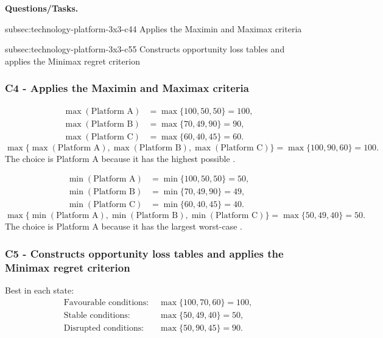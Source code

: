 	\textbf{Questions/Tasks.}
	\begin{enumerate}
		\CriterionTask
		{subsec:technology-platform-3x3-c4}{4}
		{Applies the Maximin and Maximax criteria}

		\CriterionTask
		{subsec:technology-platform-3x3-c5}{5}
		{Constructs opportunity loss tables and applies the Minimax regret criterion}
	\end{enumerate}
	
	\subsubsection*{C4 - Applies the Maximin and Maximax criteria}
	\label{subsec:technology-platform-3x3-c4}
	
	\[
	\begin{aligned}
		\max(\text{Platform A}) &= \max\{100,50,50\}=100,\\
		\max(\text{Platform B}) &= \max\{70,49,90\}=90,\\
		\max(\text{Platform C}) &= \max\{60,40,45\}=60.
	\end{aligned}
	\]
	\[
	\max\{\max(\text{Platform A}),\max(\text{Platform B}),
	\max(\text{Platform C})\}
	=\max\{100,90,60\}
	=100.
	\]
	The  choice is Platform A because it has the highest possible .
	
	\[
	\begin{aligned}
		\min(\text{Platform A}) &= \min\{100,50,50\}=50,\\
		\min(\text{Platform B}) &= \min\{70,49,90\}=49,\\
		\min(\text{Platform C}) &= \min\{60,40,45\}=40.
	\end{aligned}
	\]
	\[
	\max\{\min(\text{Platform A}),\min(\text{Platform B}),
	\min(\text{Platform C})\}
	=\max\{50,49,40\}
	=50.
	\]
	The  choice is Platform A because it has the largest worst-case .
	
	\subsubsection*{C5 - Constructs opportunity loss tables and applies the Minimax regret criterion}
	\label{subsec:technology-platform-3x3-c5}
	
	Best  in each state:
	\[
	\begin{aligned}
		\text{Favourable conditions: }&\max\{100,70,60\}=100,\\
		\text{Stable conditions: }&\max\{50,49,40\}=50,\\
		\text{Disrupted conditions: }&\max\{50,90,45\}=90.
	\end{aligned}
	\]
	
